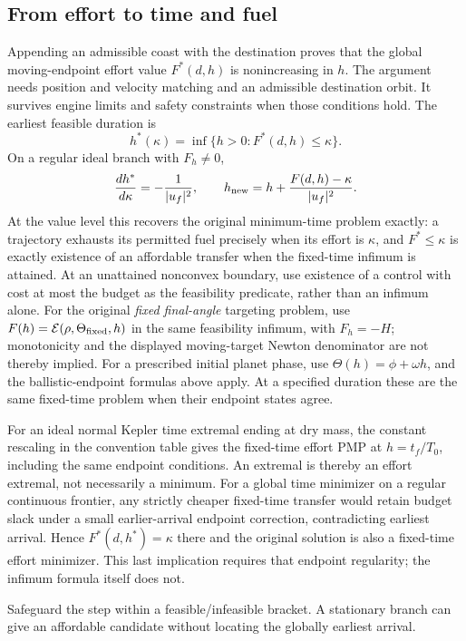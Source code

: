 \subsection{From effort to time and fuel}
Appending an admissible coast with the destination proves that the
global moving-endpoint effort value $F^*(d,h)$ is nonincreasing in $h$.
The argument needs position and velocity matching and an admissible
destination orbit. It survives engine limits and safety constraints
when those conditions hold. The earliest feasible duration is
\begin{equation}
 h^*(\kappa)=\inf\{h>0:F^*(d,h)\le\kappa\}.
 \label{eq:timeinverse}
\end{equation}
On a regular ideal branch with $F_h\ne0$,
\begin{equation}
 \frac{dh^*}{d\kappa}=-\frac1{|u_f|^2},\qquad
 h_{\rm new}=h+\frac{F(d,h)-\kappa}{|u_f|^2}.
\end{equation}
At the value level this recovers the original minimum-time problem
exactly: a trajectory exhausts its permitted fuel precisely when its
effort is $\kappa$, and $F^*\le\kappa$ is exactly existence of an affordable
transfer when the fixed-time infimum is attained. At an unattained
nonconvex boundary, use existence of a control with cost at most the
budget as the feasibility predicate, rather than an infimum alone.
For the original \emph{fixed final-angle} targeting problem, use
$F(h)=\mathcal E(\rho,\Theta_{\rm fixed},h)$ in the same feasibility
infimum, with $F_h=-H$; monotonicity and the displayed moving-target
Newton denominator are not thereby implied. For a prescribed initial
planet phase, use $\Theta(h)=\phi+\omega h$, and the ballistic-endpoint
formulas above apply. At a specified duration these are the same
fixed-time problem when their endpoint states agree.

For an ideal normal Kepler time extremal ending at dry mass,
the constant rescaling in the convention table gives the fixed-time
effort PMP at $h=t_f/T_0$, including the same endpoint conditions.
An extremal is thereby an effort extremal, not necessarily a minimum.
For a global time minimizer on a regular continuous frontier, any strictly
cheaper fixed-time transfer would retain budget slack under a small
earlier-arrival endpoint correction, contradicting earliest arrival.
Hence $F^*(d,h^*)=\kappa$ there and the original solution is also a
fixed-time effort minimizer. This last implication requires that endpoint
regularity; the infimum formula itself does not.

Safeguard the step within a feasible/infeasible bracket. A stationary
branch can give an affordable candidate without locating the globally
earliest arrival.

